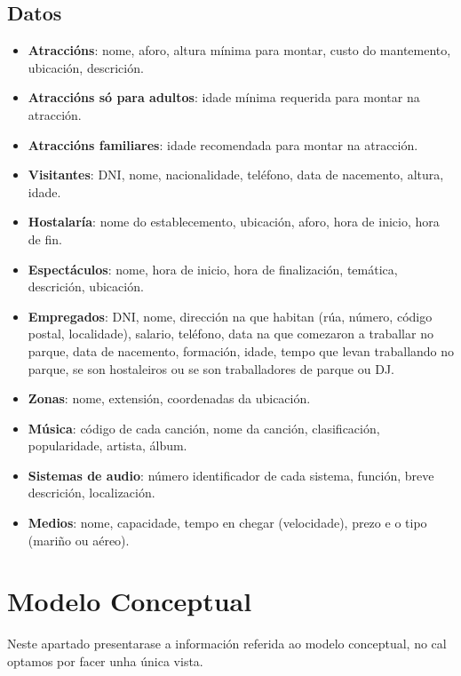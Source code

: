 \documentclass[12pt,a4paper]{book}
\theoremstyle{definition}
\theoremstyle{break}
\begin{document}
	\section{Datos}
	\begin{itemize}
		\item \textbf{Atraccións}: nome, aforo, altura mínima para montar, custo do mantemento, ubicación, descrición.
		
		\item \textbf{Atraccións só para adultos}: idade mínima requerida para montar na atracción.
		
		\item \textbf{Atraccións familiares}: idade recomendada para montar na atracción.
		
		\item \textbf{Visitantes}: DNI, nome, nacionalidade, teléfono, data de nacemento, altura, idade.
		
		\item \textbf{Hostalaría}: nome do establecemento, ubicación, aforo, hora de inicio, hora de fin.
		
		\item \textbf{Espectáculos}: nome, hora de inicio, hora de finalización, temática, descrición, ubicación.
		
		\item \textbf{Empregados}: DNI, nome, dirección na que habitan (rúa, número, código postal, localidade), salario, teléfono, data na que comezaron a traballar no parque, data de nacemento, formación, idade, tempo que levan traballando no parque, se son hostaleiros ou se son traballadores de parque ou DJ.
		
		\item \textbf{Zonas}: nome, extensión, coordenadas da ubicación.
		
		\item \textbf{Música}: código de cada canción, nome da canción, clasificación, popularidade, artista, álbum.
		
		\item \textbf{Sistemas de audio}: número identificador de cada sistema, función, breve
		descrición, localización.
		
		\item \textbf{Medios}: nome, capacidade, tempo en chegar (velocidade), prezo e o tipo (mariño ou aéreo).
	\end{itemize}
	
	
	
	\chapter{Modelo Conceptual}
	Neste apartado presentarase a información referida ao modelo conceptual, no cal optamos por facer unha única vista.
	
\end{document}

